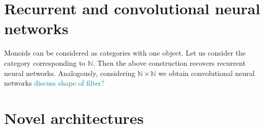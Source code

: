 \documentclass[12pt]{article}
\newcommand{\pietro}[1]{\textcolor{teal}{#1}}
\newcommand{\N}{{\mathbb{N}}}
\begin{document}
\section{Recurrent and convolutional neural networks}

Monoids can be considered as categories with one object. Let us consider the category corresponding to $\N$. Then the above construction recovers recurrent neural networks. Analogously, considering $\N \times \N$ we obtain convolutional neural networks \pietro{discuss shape of filter?}

\section{Novel architectures}



\end{document}

